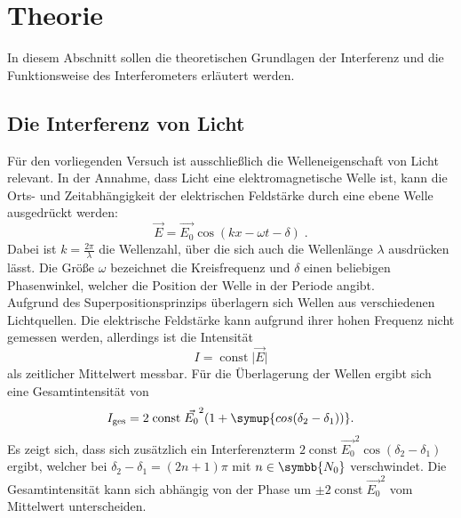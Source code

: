 \newcommand{\const}{\;\mathrm{const}\;}

\section{Theorie}

    In diesem Abschnitt sollen die theoretischen Grundlagen der Interferenz und die Funktionsweise
    des Interferometers erläutert werden.

\subsection{Die Interferenz von Licht}

    Für den vorliegenden Versuch ist ausschließlich die Welleneigenschaft von Licht relevant.
    In der Annahme,
    dass Licht eine elektromagnetische Welle ist,
    kann die Orts- und Zeitabhängigkeit der elektrischen Feldstärke durch eine ebene Welle ausgedrückt werden:
    \begin{equation}
        \label{eqn:EbeneWelle}
        \vec{E} = \vec{E_0} \cos(kx - \omega t - \delta) \; .
    \end{equation}
    Dabei ist $k = \frac{2 \pi}{\lambda}$ die Wellenzahl,
    über die sich auch die Wellenlänge $\lambda$ ausdrücken lässt.
    Die Größe $\omega$ bezeichnet die Kreisfrequenz und $\delta$ einen beliebigen Phasenwinkel,
    welcher die Position der Welle in der Periode angibt.\\
    Aufgrund des Superpositionsprinzips überlagern sich Wellen aus verschiedenen Lichtquellen.
    Die elektrische Feldstärke kann aufgrund ihrer hohen Frequenz nicht gemessen werden,
    allerdings ist die Intensität
    \begin{equation*}
        I = \const \lvert \vec{E} \rvert
    \end{equation*}
    als zeitlicher Mittelwert messbar. %
    Für die Überlagerung der Wellen ergibt sich eine Gesamtintensität von
    \begin{equation*}
        I_\text{ges} = 2 \const \vec{E_0}^2 (1 + \symup{cos(\delta_2 - \delta_1))}.
    \end{equation*}
    Es zeigt sich,
    dass sich zusätzlich ein Interferenzterm $ 2 \const \vec{E_0}^2 \cos(\delta_2 - \delta_1) $ ergibt,
    welcher bei $\delta_2 - \delta_1 = (2n + 1) \pi$ mit $n \in \symbb{N_0}$ verschwindet.
    Die Gesamtintensität kann sich abhängig von der Phase um $\pm 2 \const \vec{E_0}^2 $ vom Mittelwert unterscheiden. \\

